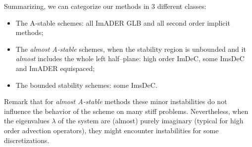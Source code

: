 Summarizing, we can categorize our methods in 3 different classes: 
\begin{itemize}
	\item The A-stable schemes: all ImADER GLB and all second order implicit methods;
	\item The \textit{almost A-stable} schemes, when the stability region is unbounded and it \textit{almost} includes the whole left half--plane: high order ImDeC, some ImsDeC and ImADER equispaced;
	\item The bounded stability schemes: some ImsDeC.
\end{itemize}

Remark that for \textit{almost A-stable} methods these minor instabilities do not influence the behavior of the scheme on many stiff problems. Nevertheless, when the eigenvalues $\lambda$ of the system are (almost) purely imaginary (typical for high order advection operators), they might encounter instabilities for some discretizations.

